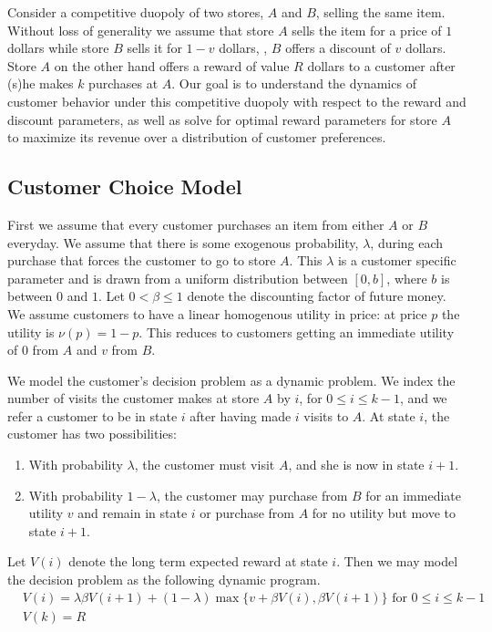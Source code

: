 Consider a competitive duopoly of two stores, $A$ and $B$, selling the same item. 
Without loss of generality we assume that store $A$ sells the item for a price of $1$ dollars while store $B$ sells it for $1-v$ dollars, \ie, $B$ offers a discount of $v$ dollars. 
Store $A$ on the other hand offers a reward of value $R$ dollars to a customer after (s)he makes $k$ purchases at $A$. 
Our goal is to understand the dynamics of customer behavior under this competitive duopoly with respect to the reward and discount parameters, as well as solve for optimal reward parameters for store $A$ to maximize its revenue over a distribution of customer preferences.

\subsection{Customer Choice Model}
First we assume that every customer purchases an item from either $A$ or $B$ everyday.
We assume that there is some exogenous probability, $\lambda$, during each purchase that forces the customer to go to store $A$.
This $\lambda$ is a customer specific parameter and is drawn from a uniform distribution between $[0,b]$, where $b$ is between $0$ and $1$.
Let $0 < \beta \leq 1$ denote the discounting factor of future money. 
We assume customers to have a linear homogenous utility in price: at price $p$ the utility is $\nu(p) = 1-p$. 
This reduces to customers getting an immediate utility of $0$ from $A$ and $v$ from $B$.

We model the customer's decision problem as a dynamic problem. We index the number of visits the customer makes at store $A$ by $i$, for $0 \leq i \leq k-1$, and we refer a customer to be in state $i$ after having made $i$ visits to $A$. At state $i$, the customer has two possibilities:
\begin{enumerate}
\item
With probability $\lambda$, the customer must visit $A$, and she is now in state $i+1$.
\item
With probability $1-\lambda$, the customer may purchase from $B$ for an immediate utility $v$ and remain in state $i$ or purchase from $A$ for no utility but move to state $i+1$.
\end{enumerate}

Let $V(i)$ denote the long term expected reward at state $i$. Then we may model the decision problem as the following dynamic program.
\begin{align*}
& V(i) = \lambda \beta V(i+1) + (1-\lambda)\max\{v+\beta V(i),\beta V(i+1) \} \mbox{ for } 0\leq i \leq k-1 \\
& V(k) = R
\end{align*}

